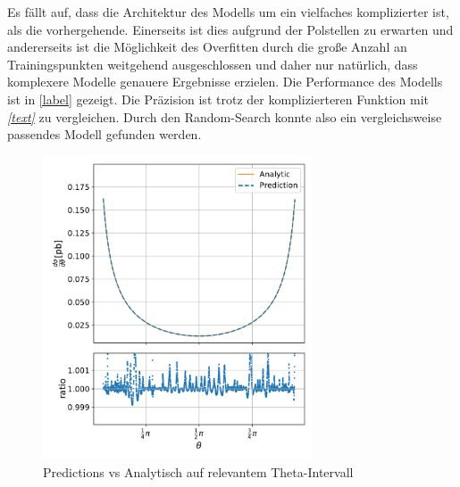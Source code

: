 Es fällt auf, dass die Architektur des Modells um ein vielfaches komplizierter ist, als die vorhergehende. Einerseits ist dies aufgrund der Polstellen zu erwarten und andererseits ist die Möglichkeit des Overfitten durch die große Anzahl an Trainingspunkten weitgehend ausgeschlossen und daher nur natürlich, dass komplexere Modelle genauere Ergebnisse erzielen. Die Performance des Modells ist in \textit{}\autoref{label} gezeigt. Die Präzision ist trotz der komplizierteren Funktion mit \textit{\autoref{text}} zu vergleichen. Durch den Random-Search konnte also ein vergleichsweise passendes Modell gefunden werden. \\
\begin{figure}[tbp]
	\centering
	\includegraphics[width=8cm]{graphics/2}
	\caption{Predictions vs Analytisch auf relevantem Theta-Intervall}
\end{figure}

